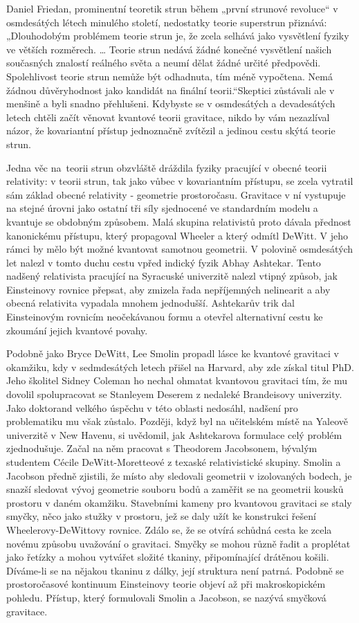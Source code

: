   Daniel Friedan, prominentní teoretik strun během „první strunové revoluce“ v osmdesátých létech
  minulého století, nedostatky teorie superstrun přiznává: „Dlouhodobým problémem teorie strun je,
  že zcela selhává jako vysvětlení fyziky ve větších rozměrech. … Teorie strun nedává žádné konečné
  vysvětlení našich současných znalostí reálného světa a neumí dělat žádné určité předpovědi.
  Spolehlivost teorie strun nemůže být odhadnuta, tím méně vypočtena. Nemá žádnou důvěryhodnost jako
  kandidát na finální teorii.“Skeptici zůstávali ale v menšině a byli snadno přehlušeni. Kdybyste se
  v osmdesátých a devadesátých letech chtěli začít věnovat kvantové teorii gravitace, nikdo by vám
  nezazlíval názor, že kovariantní přístup jednoznačně zvítězil a jedinou cestu skýtá teorie strun.
  
  Jedna věc na teorii strun obzvláště dráždila fyziky pracující v obecné teorii relativity: v teorii
  strun, tak jako vůbec v kovariantním přístupu, se zcela vytratil sám základ obecné relativity -
  geometrie prostoročasu. Gravitace v ní vystupuje na stejné úrovni jako ostatní tři síly sjednocené
  ve standardním modelu a kvantuje se obdobným způsobem. Malá skupina relativistů proto dávala
  přednost kanonickému přístupu, který propagoval Wheeler a který odmítl DeWitt. V jeho rámci by
  mělo být možné kvantovat samotnou geometrii. V polovině osmdesátých let nalezl v tomto duchu cestu
  vpřed indický fyzik Abhay Ashtekar. Tento nadšený relativista pracující na Syracuské univerzitě
  nalezl vtipný způsob, jak Einsteinovy rovnice přepsat, aby zmizela řada nepříjemných nelinearit a
  aby obecná relativita vypadala mnohem jednodušší. Ashtekarův trik dal Einsteinovým rovnicím
  neočekávanou formu a otevřel alternativní cestu ke zkoumání jejich kvantové povahy. 
  
  Podobně jako Bryce DeWitt, Lee Smolin propadl lásce ke kvantové gravitaci v okamžiku, kdy v
  sedmdesátých letech přišel na Harvard, aby zde získal titul PhD. Jeho školitel Sidney Coleman ho
  nechal ohmatat kvantovou gravitaci tím, že mu dovolil spolupracovat se Stanleyem Deserem z
  nedaleké Brandeisovy univerzity. Jako doktorand velkého úspěchu v této oblasti nedosáhl, nadšení
  pro problematiku mu však zůstalo. Později, když byl na učitelském místě na Yaleově univerzitě v
  New Havenu, si uvědomil, jak Ashtekarova formulace celý problém zjednodušuje. Začal na něm
  pracovat s Theodorem Jacobsonem, bývalým studentem Cécile DeWitt-Moretteové z texaské
  relativistické skupiny. Smolin a Jacobson předně zjistili, že místo aby sledovali geometrii v
  izolovaných bodech, je snazší sledovat vývoj geometrie souboru bodů a zaměřit se na geometrii
  kousků prostoru v daném okamžiku. Stavebními kameny pro kvantovou gravitaci se staly smyčky, něco
  jako stužky v prostoru, jež se daly užít ke konstrukci řešení Wheelerovy-DeWittovy rovnice. Zdálo
  se, že se otvírá schůdná cesta ke zcela novému způsobu uvažování o gravitaci. Smyčky se mohou
  různě řadit a proplétat jako řetízky a mohou vytvářet složité tkaniny, připomínající drátěnou
  košili. Díváme-li se na nějakou tkaninu z dálky, její struktura není patrná. Podobně se
  prostoročasové kontinuum Einsteinovy teorie objeví až při makroskopickém pohledu. Přístup, který
  formulovali Smolin a Jacobson, se nazývá smyčková gravitace. 
  
